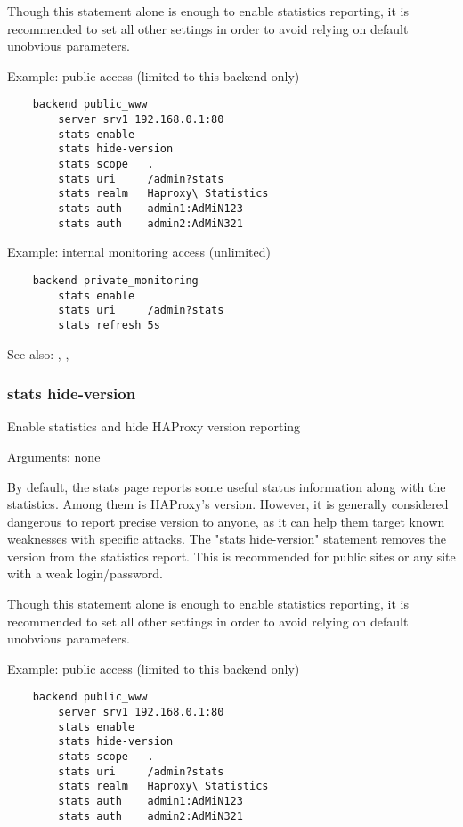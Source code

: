   Though this statement alone is enough to enable statistics reporting, it is
  recommended to set all other settings in order to avoid relying on default
  unobvious parameters.

  Example: public access (limited to this backend only)
  \begin{verbatim}
    backend public_www
        server srv1 192.168.0.1:80
        stats enable
        stats hide-version
        stats scope   .
        stats uri     /admin?stats
        stats realm   Haproxy\ Statistics
        stats auth    admin1:AdMiN123
        stats auth    admin2:AdMiN321
  \end{verbatim}
  
  Example: internal monitoring access (unlimited)
  \begin{verbatim}
    backend private_monitoring
        stats enable
        stats uri     /admin?stats
        stats refresh 5s
  \end{verbatim}

  See also: , , 


\subsubsection{stats hide-version}


  Enable statistics and hide HAProxy version reporting
 
 
  Arguments: none

  By default, the stats page reports some useful status information along with
  the statistics. Among them is HAProxy's version. However, it is generally
  considered dangerous to report precise version to anyone, as it can help them
  target known weaknesses with specific attacks. The "stats hide-version"
  statement removes the version from the statistics report. This is recommended
  for public sites or any site with a weak login/password.

  Though this statement alone is enough to enable statistics reporting, it is
  recommended to set all other settings in order to avoid relying on default
  unobvious parameters.

  Example: public access (limited to this backend only)
  \begin{verbatim}
    backend public_www
        server srv1 192.168.0.1:80
        stats enable
        stats hide-version
        stats scope   .
        stats uri     /admin?stats
        stats realm   Haproxy\ Statistics
        stats auth    admin1:AdMiN123
        stats auth    admin2:AdMiN321
   \end{verbatim}

